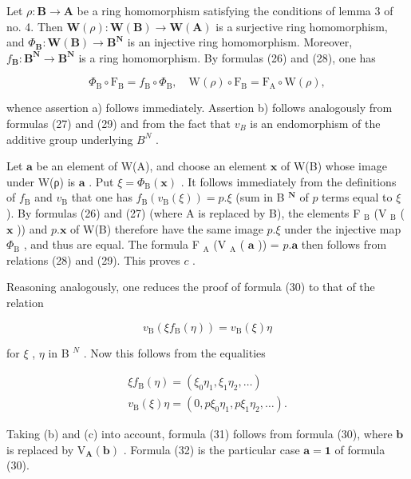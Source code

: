 Let \(\rho: \mathbf{B} \to \mathbf{A}\) be a ring homomorphism satisfying the conditions of lemma 3 of no. 4. Then \(\mathbf{W}(\rho): \mathbf{W}(\mathbf{B}) \to \mathbf{W}(\mathbf{A})\) is a surjective ring homomorphism, and \(\Phi_{\mathbf{B}}: \mathbf{W}(\mathbf{B}) \to \mathbf{B}^{\mathbf{N}}\) is an injective ring homomorphism. Moreover, \(f_{\mathbf{B}}: \mathbf{B}^{\mathbf{N}} \to \mathbf{B}^{\mathbf{N}}\) is a ring homomorphism. By formulas (26) and (28), one has

\[
\Phi_ {\mathrm{B}} \circ \mathrm{F} _ {\mathrm{B}} = f _ {\mathrm{B}} \circ \Phi_ {\mathrm{B}}, \quad \mathrm{W} (\rho) \circ \mathrm{F} _ {\mathrm{B}} = \mathrm{F} _ {\mathrm{A}} \circ \mathrm{W} (\rho),
\]

whence assertion a) follows immediately. Assertion b) follows analogously from formulas (27) and (29) and from the fact that \(v_{B}\) is an endomorphism of the additive group underlying \(B^{N}\) .

Let \(\pmb{a}\) be an element of W(A), and choose an element \(\pmb{x}\) of W(B) whose image under W(ρ) is \(\pmb{a}\) . Put \(\xi = \Phi_{\mathrm{B}}(\pmb{x})\) . It follows immediately from the definitions of \(f_{\mathrm{B}}\) and \(v_{\mathrm{B}}\) that one has \(f_{\mathrm{B}}(v_{\mathrm{B}}(\xi)) = p.\xi\) (sum in B \(^{\mathbf{N}}\) of \(p\) terms equal to \(\xi\) ). By formulas (26) and (27) (where A is replaced by B), the elements F \(_{\mathrm{B}}\) (V \(_{\mathrm{B}}\) ( \(\pmb{x}\) )) and \(p.\pmb{x}\) of W(B) therefore have the same image \(p.\xi\) under the injective map \(\Phi_{\mathrm{B}}\) , and thus are equal. The formula F \(_{\mathrm{A}}\) (V \(_{\mathrm{A}}\) ( \(\pmb{a}\) )) = \(p.\pmb{a}\) then follows from relations (28) and (29). This proves \(c\) .

Reasoning analogously, one reduces the proof of formula (30) to that of the relation

\[
v _ {\mathrm{B}} (\xi f _ {\mathrm{B}} (\eta)) = v _ {\mathrm{B}} (\xi) \eta
\]

for \(\xi\) , \(\eta\) in B \(^{N}\) . Now this follows from the equalities

\[
\begin{array}{l} \xi f _ {\mathrm{B}} (\eta) = (\xi_ {0} \eta_ {1}, \xi_ {1} \eta_ {2}, \dots) \\ v _ {\mathrm{B}} (\xi) \eta = (0, p \xi_ {0} \eta_ {1}, p \xi_ {1} \eta_ {2}, \dots). \end{array}
\]

Taking (b) and (c) into account, formula (31) follows from formula (30), where \(\boldsymbol{b}\) is replaced by \(\mathrm{V}_{\mathbf{A}}(\boldsymbol{b})\) . Formula (32) is the particular case \(\boldsymbol{a} = \boldsymbol{1}\) of formula (30).


